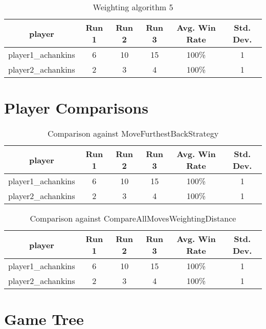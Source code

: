 \documentclass[
	12pt, %
]{fphw}
\begin{document}
\begin{table}[ht]
	\centering
	\begin{tabular}{||c | c c c c c||}
		\hline
		player & Run 1&   Run 2 & Run 3 & Avg. Win Rate & Std. Dev. \\ [0.5ex]
		\hline\hline
		player1\_achankins &  6 & 10 & 15 & 100\% & 1 \\
		\hline
		player2\_achankins & 2 & 3 & 4 & 100\% & 1 \\ [1ex]
		\hline
	\end{tabular}
	\caption{Weighting algorithm 5}
	\label{table:5}
\end{table}


\section*{Player Comparisons}

\begin{table}[ht]
	\centering
	\begin{tabular}{||c | c c c c c||}
		\hline
		player & Run 1&   Run 2 & Run 3 & Avg. Win Rate & Std. Dev. \\ [0.5ex]
		\hline\hline
		player1\_achankins &  6 & 10 & 15 & 100\% & 1 \\
		\hline
		player2\_achankins & 2 & 3 & 4 & 100\% & 1 \\ [1ex]
		\hline
	\end{tabular}
	\caption{Comparison against MoveFurthestBackStrategy}
	\label{table:6}
\end{table}

\begin{table}[ht]
	\centering
	\begin{tabular}{||c | c c c c c||}
		\hline
		player & Run 1&   Run 2 & Run 3 & Avg. Win Rate & Std. Dev. \\ [0.5ex]
		\hline\hline
		player1\_achankins &  6 & 10 & 15 & 100\% & 1 \\
		\hline
		player2\_achankins & 2 & 3 & 4 & 100\% & 1 \\ [1ex]
		\hline
	\end{tabular}
	\caption{Comparison against CompareAllMovesWeightingDistance}
	\label{table:7}
\end{table}


\section*{Game Tree}
\end{document}
